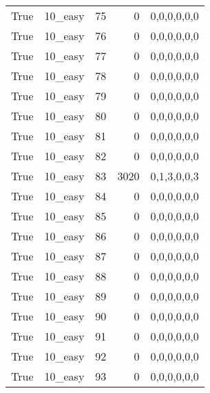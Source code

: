 \begin{tabular}{llrrl}
 True            & 10\_easy             &            75 &                     0 & 0,0,0,0,0,0   \\
 True            & 10\_easy             &            76 &                     0 & 0,0,0,0,0,0   \\
 True            & 10\_easy             &            77 &                     0 & 0,0,0,0,0,0   \\
 True            & 10\_easy             &            78 &                     0 & 0,0,0,0,0,0   \\
 True            & 10\_easy             &            79 &                     0 & 0,0,0,0,0,0   \\
 True            & 10\_easy             &            80 &                     0 & 0,0,0,0,0,0   \\
 True            & 10\_easy             &            81 &                     0 & 0,0,0,0,0,0   \\
 True            & 10\_easy             &            82 &                     0 & 0,0,0,0,0,0   \\
 True            & 10\_easy             &            83 &                  3020 & 0,1,3,0,0,3   \\
 True            & 10\_easy             &            84 &                     0 & 0,0,0,0,0,0   \\
 True            & 10\_easy             &            85 &                     0 & 0,0,0,0,0,0   \\
 True            & 10\_easy             &            86 &                     0 & 0,0,0,0,0,0   \\
 True            & 10\_easy             &            87 &                     0 & 0,0,0,0,0,0   \\
 True            & 10\_easy             &            88 &                     0 & 0,0,0,0,0,0   \\
 True            & 10\_easy             &            89 &                     0 & 0,0,0,0,0,0   \\
 True            & 10\_easy             &            90 &                     0 & 0,0,0,0,0,0   \\
 True            & 10\_easy             &            91 &                     0 & 0,0,0,0,0,0   \\
 True            & 10\_easy             &            92 &                     0 & 0,0,0,0,0,0   \\
 True            & 10\_easy             &            93 &                     0 & 0,0,0,0,0,0   \\

\end{tabular}
